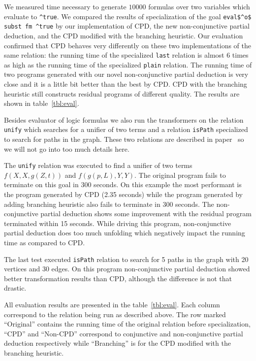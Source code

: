 We measured time necessary to generate $10000$ formulas over two variables which evaluate to \lstinline{^true}.
We compared the results of specialization of the goal \lstinline{eval$^o$ subst fm ^true} by our implementation of CPD, the new non-conjunctive partial deduction, and the CPD modified with the branching heuristic.
Our evaluation confirmed that CPD behaves very differently on these two implementations of the same relation: the running time of the specialized \lstinline{last} relation is almost 6 times as high as the running time of the specialized \lstinline{plain} relation.
The running time of two programs generated with our novel non-conjunctive partial deduction is very close and it is a little bit better than the best by CPD.
CPD with the branching heuristic still constructs residual programs of different quality.
The results are shown in table~\ref{tbl:eval}.

Besides evaluator of logic formulas we also run the transformers on the relation \lstinline{unify} which searches for a unifier of two terms and a relation \lstinline{isPath} specialized to search for paths in the graph.
These two relations are described in paper~\cite{lozov2019relational} so we will not go into too much details here.

The \lstinline{unify} relation was executed to find a unifier of two terms $f(X, X, g(Z, t))$ and $f(g(p, L), Y, Y)$.
The original \mk{} program fails to terminate on this goal in 300 seconds.
On this example the most performant is the program generated by CPD (2.35 seconds) while the program generated by adding branching heuristic also fails to terminate in 300 seconds.
The non-conjunctive partial deduction shows some improvement with the residual program terminated within 15 seconds.
While driving this program, non-conjunctive partial deduction does too much unfolding which negatively impact the running time as compared to CPD.

The last test executed \lstinline{isPath} relation to search for 5 paths in the graph with 20 vertices and 30 edges.
On this program non-conjunctive partial deduction showed better transformation results than CPD, although the difference is not that drastic.

All evaluation results are presented in the table~\ref{tbl:eval}.
Each column correspond to the relation being run as described above.
The row marked ``Original'' contains the running time of the original \mk{} relation before specialization, ``CPD'' and ``Non-CPD'' correspond to conjunctive and non-conjunctive partial deduction respectively while ``Branching'' is for the CPD modified with the branching heuristic.

